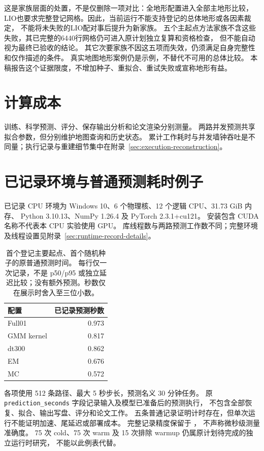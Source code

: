 这是家族层面的处置，不是仅删除一项对比：全地形配置进入全部主地形比较，
LIO也要求完整登记网格。因此，当前运行不能支持登记的总体地形或各因素裁定，
不能将未失败的LIO配对事后提升为新家族。
五个主起点方法家族不含这些失败，其已完整的6440行网格仍可进入原计划独立复算和资格检查，
但不能自动视为最终已验收的结论。
其它次要家族不因这五项而失效，仍须满足自身完整性和仅作描述的条件。
真实地图地形案例仍是示例，不替代不可用的总体比较。
本稿报告这个证据限度，不增加种子、重拟合、重试失败或宣称地形有益。


\section{计算成本}
训练、科学预测、评分、保存输出分析和论文渲染分别测量。
两路并发预测共享拟合参数，但分别维护地图查询和历史状态。
累计工作耗时与并发墙钟吞吐是不同量；执行记录与重建细节集中在附录~\ref{sec:execution-reconstruction}。


\section{已记录环境与普通预测耗时例子}
\label{sec:preliminary-cost}\hypertarget{sec:preliminary-cost}{}
已记录 CPU 环境为 Windows 10、6 个物理核、12 个逻辑 CPU、31.73 GiB 内存、
Python 3.10.13、NumPy 1.26.4 及 PyTorch 2.3.1+cu121。
安装包含 CUDA 名称不代表本 CPU 实验使用 GPU。
库线程数与两路预测工作数不同；完整环境及线程设置见附录~\ref{sec:runtime-record-details}。

\begin{table}[htbp]
\centering\small
\caption{首个登记主要起点、首个随机种子的原普通预测时间。
每行仅一次记录，不是 p50/p95 或独立延迟比较；没有额外预测。秒数仅在展示时舍入至三位小数。}
\label{tab:preliminary-cost}\hypertarget{tab:preliminary-cost}{}
\begin{tabular}{@{}lr@{}}
\toprule
配置 & 已记录预测秒数\\
\midrule
Full01 & 0.973\\
GMM kernel & 0.817\\
dt300 & 0.862\\
EM & 0.676\\
MC & 0.572\\
\bottomrule
\end{tabular}
\end{table}
各项使用 512 条路径、最大 5 秒步长，预测名义 30 分钟任务。
原 \texttt{prediction\_seconds} 字段记录输入及模型已准备后的预测执行，
不包含全部恢复、拟合、输出写盘、评分和论文工作。
五条普通记录证明计时存在，但单次运行不能证明加速、尾延迟或部署成本。
完整记录精度保留于 ，
不声称微秒级测量准确度。
75 次 cold、75 次 warm 及 15 次排除 warmup 仍属原计划待完成的独立运行时研究，
不能以此例表代替。


